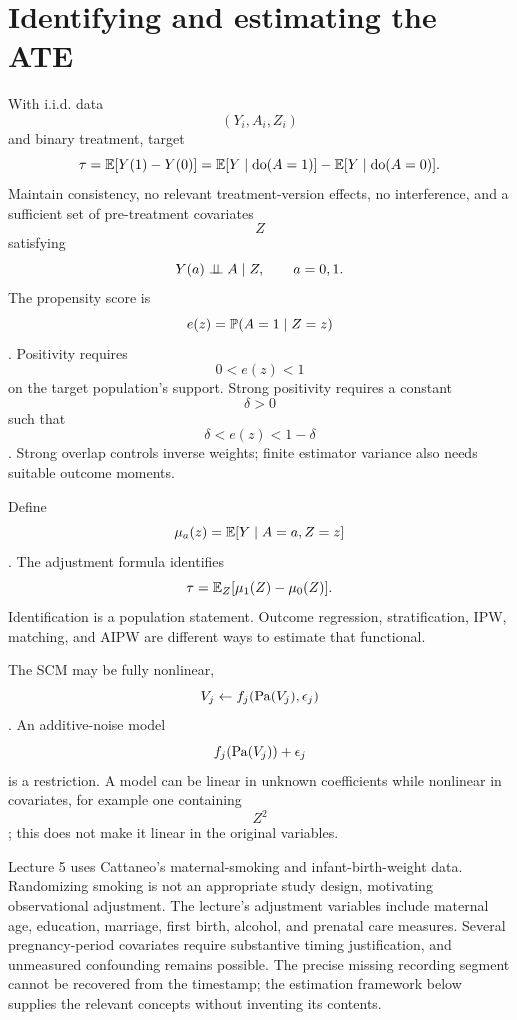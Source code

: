 \section{Identifying and estimating the ATE}
With i.i.d. data $$(Y_i,A_i,Z_i)$$ and binary treatment, target
\begin{equation}
\tau=\mathbb E[Y(1)-Y(0)]=\mathbb E[Y\mid\operatorname{do}(A=1)]-\mathbb E[Y\mid\operatorname{do}(A=0)].
\end{equation}
Maintain consistency, no relevant treatment-version effects, no interference, and a sufficient set of pre-treatment covariates $$Z$$ satisfying
\begin{equation}
Y(a)\mathrel{\perp\!\!\!\perp} A\mid Z,\qquad a=0,1.
\end{equation}
The propensity score is $$e(z)=\mathbb P(A=1\mid Z=z)$$. Positivity requires $$0<e(z)<1$$ on the target population's support. Strong positivity requires a constant $$\delta>0$$ such that $$\delta<e(z)<1-\delta$$. Strong overlap controls inverse weights; finite estimator variance also needs suitable outcome moments.

Define $$\mu_a(z)=\mathbb E[Y\mid A=a,Z=z]$$. The adjustment formula identifies
\begin{equation}
\tau=\mathbb E_Z[\mu_1(Z)-\mu_0(Z)].
\end{equation}
Identification is a population statement. Outcome regression, stratification, IPW, matching, and AIPW are different ways to estimate that functional.

The SCM may be fully nonlinear, $$V_j\leftarrow f_j(\operatorname{Pa}(V_j),\epsilon_j)$$. An additive-noise model $$f_j(\operatorname{Pa}(V_j))+\epsilon_j$$ is a restriction. A model can be linear in unknown coefficients while nonlinear in covariates, for example one containing $$Z^2$$; this does not make it linear in the original variables.
\begin{todo}
Lecture 5 uses Cattaneo's maternal-smoking and infant-birth-weight data. Randomizing smoking is not an appropriate study design, motivating observational adjustment. The lecture's adjustment variables include maternal age, education, marriage, first birth, alcohol, and prenatal care measures. Several pregnancy-period covariates require substantive timing justification, and unmeasured confounding remains possible. The precise missing recording segment cannot be recovered from the timestamp; the estimation framework below supplies the relevant concepts without inventing its contents.
\end{todo}


